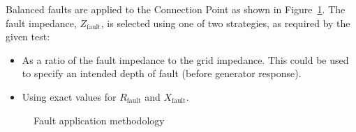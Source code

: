 Balanced faults are applied to the Connection Point as shown in Figure~\ref{fig:balanced-fault-diagram}. The fault impedance, $Z_{\text{fault}}$, is selected using one of two strategies, as required by the given test:

\begin{itemize}
	\item As a ratio of the fault impedance to the grid impedance. This could be used to specify an intended depth of fault (before generator response).
	\item Using exact values for $R_{\text{fault}}$ and $X_{\text{fault}}$.
\end{itemize}

\begin{figure}[h]
	\centering
	
	\caption{Fault application methodology}
	\label{fig:balanced-fault-diagram}
\end{figure}